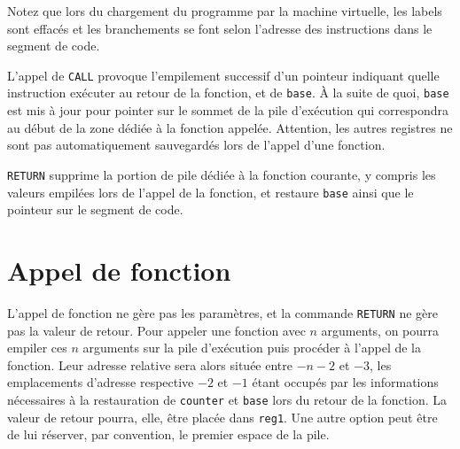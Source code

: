 \documentclass[12pt,a4paper]{article}
\begin{document}
Notez que lors du chargement du programme par la machine virtuelle,
les labels sont effacés et les branchements se font selon l'adresse
des instructions dans le segment de code.

L'appel de \texttt{CALL} provoque l'empilement successif d'un pointeur
indiquant quelle instruction exécuter au
retour de la fonction, et de \texttt{base}. À la suite de quoi,
\texttt{base} est mis à jour pour pointer sur le sommet de la pile
d'exécution
qui correspondra au début de la zone dédiée à la fonction appelée.
Attention, les autres registres ne sont pas automatiquement sauvegardés lors
de l'appel d'une fonction.

\texttt{RETURN} supprime la portion de pile dédiée à la fonction
courante, y compris les valeurs empilées lors de l'appel de la fonction,
et restaure \texttt{base} ainsi que le pointeur sur le segment de code.

\section{Appel de fonction}
L'appel de fonction ne gère pas les paramètres, et la commande
\texttt{RETURN} ne gère pas la valeur de retour.  Pour appeler une
fonction avec $n$ arguments, on pourra empiler ces $n$ arguments sur
la pile d'exécution puis procéder à l'appel de la fonction. Leur
adresse relative sera alors située entre $-n-2$ et $-3$, les
emplacements d'adresse respective $-2$ et $-1$ étant occupés par les
informations nécessaires à la restauration de \texttt{counter} et
\texttt{base} lors du retour de la fonction.  La valeur de retour pourra,
elle, être placée dans \texttt{reg1}. Une autre option peut être de lui
réserver, par convention, le premier espace de la pile.

\end{document}
